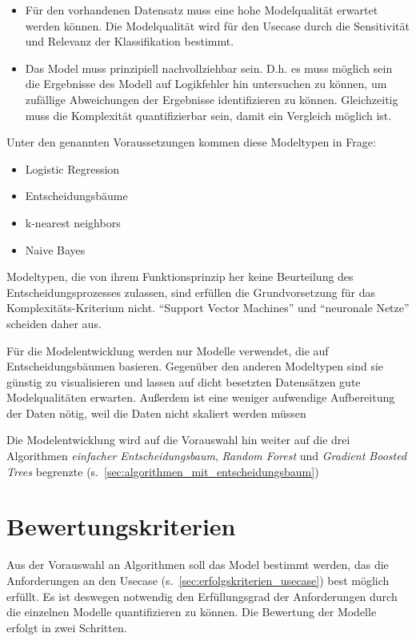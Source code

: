\begin{itemize}
    \item Für den vorhandenen Datensatz muss eine hohe Modelqualität erwartet werden können. Die Modelqualität wird für den Usecase durch die Sensitivität und Relevanz der Klassifikation bestimmt.
    \item Das Model muss prinzipiell nachvollziehbar sein. D.h. es muss möglich sein die Ergebnisse des Modell auf Logikfehler hin untersuchen zu können, um zufällige Abweichungen der Ergebnisse identifizieren zu können. Gleichzeitig muss die Komplexität quantifizierbar sein, damit ein Vergleich möglich ist.
\end{itemize}

Unter den genannten Voraussetzungen kommen diese Modeltypen in Frage:
\begin{itemize}
    \item Logistic Regression
    \item Entscheidungsbäume
    \item k-nearest neighbors
    \item Naive Bayes
\end{itemize}

Modeltypen, die von ihrem Funktionsprinzip her keine Beurteilung des Entscheidungsprozesses zulassen, sind erfüllen die Grundvorsetzung für das Komplexitäts-Kriterium nicht. \enquote{Support Vector Machines} und \enquote{neuronale Netze} scheiden daher aus.

Für die Modelentwicklung werden nur Modelle verwendet, die auf Entscheidungsbäumen basieren. Gegenüber den anderen Modeltypen sind sie günstig zu visualisieren und lassen auf dicht besetzten Datensätzen gute Modelqualitäten erwarten. Außerdem ist eine weniger aufwendige Aufbereitung der Daten nötig, weil die Daten nicht skaliert werden müssen~\cite[S.~84--85]{Muller.2017}

Die Modelentwicklung wird auf die Vorauswahl hin weiter auf die drei Algorithmen \textit{einfacher Entscheidungsbaum}, \textit{Random Forest} und \textit{Gradient Boosted Trees} begrenzte (s.~\cref{sec:algorithmen_mit_entscheidungsbaum})
\section{Bewertungskriterien}
\label{sec:bewertungskriterien}
Aus der Vorauswahl an Algorithmen soll das Model bestimmt werden, das die Anforderungen an den Usecase (s.~\cref{sec:erfolgskriterien_usecase}) best möglich erfüllt. Es ist deswegen notwendig den Erfüllungsgrad der Anforderungen durch die einzelnen Modelle quantifizieren zu können. Die Bewertung der Modelle erfolgt in zwei Schritten.

